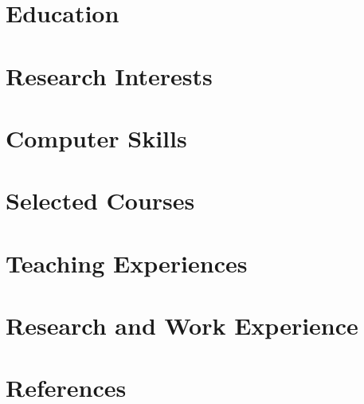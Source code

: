 \documentclass[10pt]{article}
\begin{document}
  \printVersionAndDate
  
  \vspace{-20pt}
  \begin{paracol}{2}
    \section{Education}
      
    \section{Research Interests}
      
    \section{Computer Skills}
      
    \section{Selected Courses}
      
    \section{Teaching Experiences}
      
    \switchcolumn
%      
    \section{Research and Work Experience}
      
    \section{References}
      
  \end{paracol}
\end{document}
